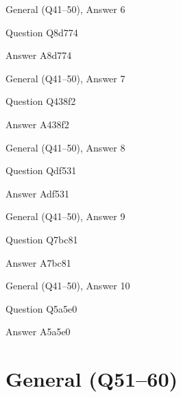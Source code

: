 \documentclass[11pt]{beamer}
\begin{document}
\begin{frame}[t]{General (Q41--50), Answer 6}
\vspace{2em}
\begin{block}{Question}
Q8d774
\end{block}
\pause{}
\begin{block}{Answer}
A8d774
\end{block}
\end{frame}
    

\begin{frame}[t]{General (Q41--50), Answer 7}
\vspace{2em}
\begin{block}{Question}
Q438f2
\end{block}
\pause{}
\begin{block}{Answer}
A438f2
\end{block}
\end{frame}
    

\begin{frame}[t]{General (Q41--50), Answer 8}
\vspace{2em}
\begin{block}{Question}
Qdf531
\end{block}
\pause{}
\begin{block}{Answer}
Adf531
\end{block}
\end{frame}
    

\begin{frame}[t]{General (Q41--50), Answer 9}
\vspace{2em}
\begin{block}{Question}
Q7bc81
\end{block}
\pause{}
\begin{block}{Answer}
A7bc81
\end{block}
\end{frame}
    

\begin{frame}[t]{General (Q41--50), Answer 10}
\vspace{2em}
\begin{block}{Question}
Q5a5e0
\end{block}
\pause{}
\begin{block}{Answer}
A5a5e0
\end{block}
\end{frame}
    

\section{General (Q51--60)}
    
\end{document}
